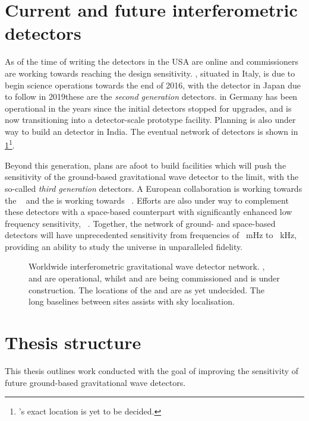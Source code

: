 \section{Current and future interferometric detectors}
As of the time of writing the \ALIGO{} detectors in the USA are online and commissioners are working towards reaching the design sensitivity. \AVIRGO{}, situated in Italy, is due to begin science operations towards the end of 2016, with the \KAGRA{} detector in Japan due to follow in 2019\textemdash these are the \emph{second generation} detectors. \GEO{} in Germany has been operational in the years since the initial detectors stopped for upgrades, and is now transitioning into a detector-scale prototype facility. Planning is also under way to build an \ALIGO{} detector in India. The eventual network of detectors is shown in \cref{fig:detector-network}\footnote{\INDIGO{}'s exact location is yet to be decided.}.

Beyond this generation, plans are afoot to build facilities which will push the sensitivity of the ground-based gravitational wave detector to the limit, with the so-called \emph{third generation} detectors. A European collaboration is working towards the \emph{\ET{}}~\cite{ET2011} and the \LSC{} is working towards \emph{\LIGOCE{}}~\cite{Dwyer2015, aligocosmic2016}. Efforts are also under way to complement these detectors with a space-based counterpart with significantly enhanced low frequency sensitivity, \emph{\ELISA{}}~\cite{Amaro-Seoane2012}. Together, the network of ground- and space-based detectors will have unprecedented sensitivity from frequencies of \SI{}{\milli\hertz} to \SI{}{\kilo\hertz}, providing an ability to study the universe in unparalleled fidelity.

\begin{figure}
  \centering
  
  \caption[Worldwide interferometric gravitational wave detector network]{\label{fig:detector-network}Worldwide interferometric gravitational wave detector network. \GEO{}, \LHO{} and \LLO{} are operational, whilst \VIRGO{} and \KAGRA{} are being commissioned and \INDIGO{} is under construction. The locations of the \ET{} and \LIGOCE{} are as yet undecided. The long baselines between sites assists with sky localisation.}
\end{figure}

\section{Thesis structure}
This thesis outlines work conducted with the goal of improving the sensitivity of future ground-based gravitational wave detectors.

